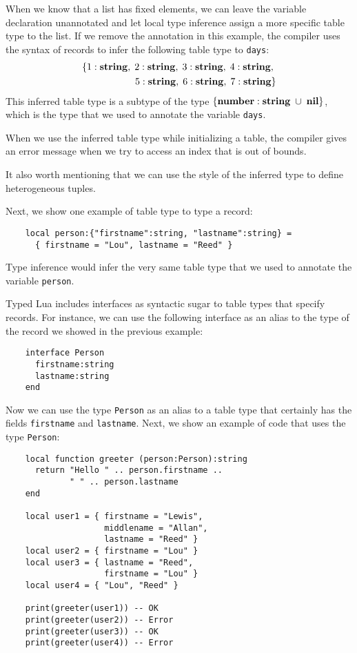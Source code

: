 When we know that a list has fixed elements, we can leave the
variable declaration unannotated and let local type inference assign
a more specific table type to the list.
If we remove the annotation in this example, the compiler uses the
syntax of records to infer the following table type to \texttt{days}:
\begin{align*}
\{{1:\mathbf{string}},\;{2:\mathbf{string}},\;{3:\mathbf{string}},\;{4:\mathbf{string}},\;\\
{5:\mathbf{string}},\;{6:\mathbf{string}},\;{7:\mathbf{string}}\}
\end{align*}
This inferred table type is a subtype of the type
$\{\mathbf{number}:\mathbf{string}\;\cup\;\mathbf{nil}\}$, which is the type that we used to
annotate the variable \texttt{days}.

When we use the inferred table type while initializing a table, the
compiler gives an error message when we try to access an index that
is out of bounds.

It also worth mentioning that we can use the style of the inferred
type to define heterogeneous tuples.

Next, we show one example of table type to type a record:
\begin{verbatim}
    local person:{"firstname":string, "lastname":string} =
      { firstname = "Lou", lastname = "Reed" } 
\end{verbatim}

Type inference would infer the very same table type that we used to
annotate the variable \texttt{person}.

Typed Lua includes interfaces as syntactic sugar to table types
that specify records.
For instance, we can use the following interface as an alias to the
type of the record we showed in the previous example:
\begin{verbatim}
    interface Person
      firstname:string
      lastname:string
    end
\end{verbatim}

Now we can use the type \texttt{Person} as an alias to a table type
that certainly has the fields \texttt{firstname} and \texttt{lastname}.
Next, we show an example of code that uses the type \texttt{Person}:
\begin{verbatim}
    local function greeter (person:Person):string
      return "Hello " .. person.firstname ..
             " " .. person.lastname
    end

    local user1 = { firstname = "Lewis",
                    middlename = "Allan",
                    lastname = "Reed" }
    local user2 = { firstname = "Lou" }
    local user3 = { lastname = "Reed",
                    firstname = "Lou" }
    local user4 = { "Lou", "Reed" }

    print(greeter(user1)) -- OK
    print(greeter(user2)) -- Error
    print(greeter(user3)) -- OK
    print(greeter(user4)) -- Error
\end{verbatim}

